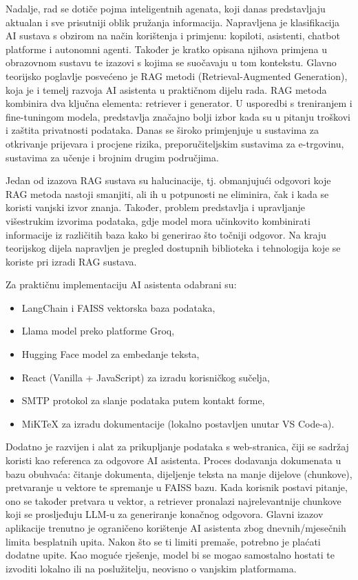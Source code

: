 \documentclass[]{foi}
\begin{document}
Nadalje, rad se dotiče pojma inteligentnih agenata, koji danas predstavljaju aktualan i sve prisutniji oblik pružanja informacija. Napravljena je klasifikacija AI 
sustava s obzirom na način korištenja i primjenu: kopiloti, asistenti, chatbot platforme i autonomni agenti. Također je kratko opisana njihova primjena u obrazovnom
sustavu te izazovi s kojima se suočavaju u tom kontekstu. Glavno teorijsko poglavlje posvećeno je RAG metodi (Retrieval-Augmented Generation), koja je i temelj razvoja 
AI asistenta u praktičnom dijelu rada. RAG metoda kombinira dva ključna elementa: retriever i generator. U usporedbi s treniranjem i fine-tuningom modela, predstavlja 
značajno bolji izbor kada su u pitanju troškovi i zaštita privatnosti podataka. Danas se široko primjenjuje u sustavima za otkrivanje prijevara i procjene rizika, 
preporučiteljskim sustavima za e-trgovinu, sustavima za učenje i brojnim drugim područjima.

Jedan od izazova RAG sustava su halucinacije, tj. obmanjujući odgovori koje RAG metoda nastoji smanjiti, ali ih u potpunosti ne eliminira, čak i kada se koristi vanjski 
izvor znanja. Također, problem predstavlja i upravljanje višestrukim izvorima podataka, gdje model mora učinkovito kombinirati informacije iz različitih baza kako bi 
generirao što točniji odgovor. Na kraju teorijskog dijela napravljen je pregled dostupnih biblioteka i tehnologija koje se koriste pri izradi RAG sustava.

Za praktičnu implementaciju AI asistenta odabrani su:
\begin{itemize}
    \item LangChain i FAISS vektorska baza podataka,
    \item Llama model preko platforme Groq,
    \item Hugging Face model za embedanje teksta,
    \item React (Vanilla + JavaScript) za izradu korisničkog sučelja,
    \item SMTP protokol za slanje podataka putem kontakt forme,
    \item MiKTeX za izradu dokumentacije (lokalno postavljen unutar VS Code-a).
\end{itemize}

Dodatno je razvijen i alat za prikupljanje podataka s web-stranica, čiji se sadržaj koristi kao referenca za odgovore AI asistenta. 
Proces dodavanja dokumenata u bazu obuhvaća: čitanje dokumenta, dijeljenje teksta na manje dijelove (chunkove), pretvaranje u vektore te spremanje u FAISS bazu. 
Kada korisnik postavi pitanje, ono se također pretvara u vektor, a retriever pronalazi najrelevantnije chunkove koji se prosljeđuju LLM-u za generiranje konačnog odgovora.
Glavni izazov aplikacije trenutno je ograničeno korištenje AI asistenta zbog dnevnih/mjesečnih limita besplatnih upita. Nakon što se ti limiti premaše, potrebno je 
plaćati dodatne upite. Kao moguće rješenje, model bi se mogao samostalno hostati te izvoditi lokalno ili na poslužitelju, neovisno o vanjskim platformama.
\end{document}

